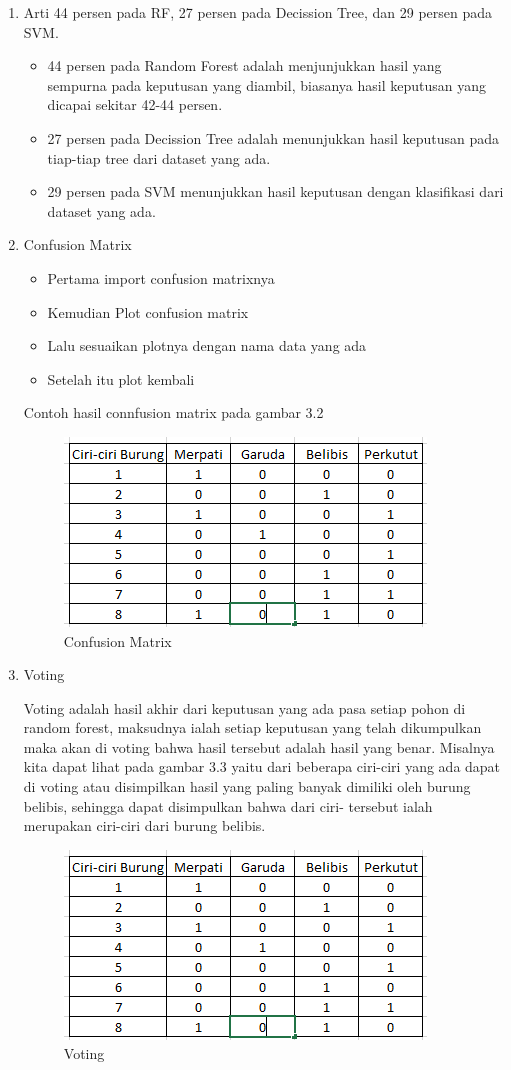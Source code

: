\begin{enumerate}
\item Arti 44 persen pada RF, 27 persen pada Decission Tree, dan 29 persen pada SVM.
\begin{itemize}
\item 44 persen pada Random Forest adalah menjunjukkan hasil yang sempurna pada keputusan yang diambil, biasanya hasil keputusan yang dicapai sekitar 42-44 persen.
\item 27 persen pada Decission Tree adalah menunjukkan hasil keputusan pada tiap-tiap tree dari dataset yang ada.
\item 29 persen pada SVM menunjukkan hasil keputusan dengan klasifikasi dari dataset yang ada.
\end{itemize}
\item Confusion Matrix
\begin{itemize}
\item Pertama import confusion matrixnya
\item Kemudian Plot confusion matrix
\item Lalu sesuaikan plotnya dengan nama data yang ada
\item Setelah itu plot kembali
\end{itemize}
\par
Contoh hasil connfusion matrix pada gambar 3.2
\begin{figure}[ht]
\centering
\includegraphics[scale=0.9]{figures/RF/1_2.png}
\caption{Confusion Matrix}
\end{figure}
\item Voting
\par
Voting adalah hasil akhir dari keputusan yang ada pasa setiap pohon di random forest, maksudnya ialah setiap keputusan yang telah dikumpulkan maka akan di voting bahwa hasil tersebut adalah hasil yang benar. Misalnya kita dapat lihat pada gambar 3.3 yaitu dari beberapa ciri-ciri yang ada dapat di voting atau disimpilkan hasil yang paling banyak dimiliki oleh burung belibis, sehingga dapat disimpulkan bahwa dari ciri- tersebut ialah merupakan ciri-ciri dari burung belibis. 
\begin{figure}[ht]
\centering
\includegraphics[scale=0.9]{figures/RF/1_2.png}
\caption{Voting}
\end{figure}


\end{enumerate}
